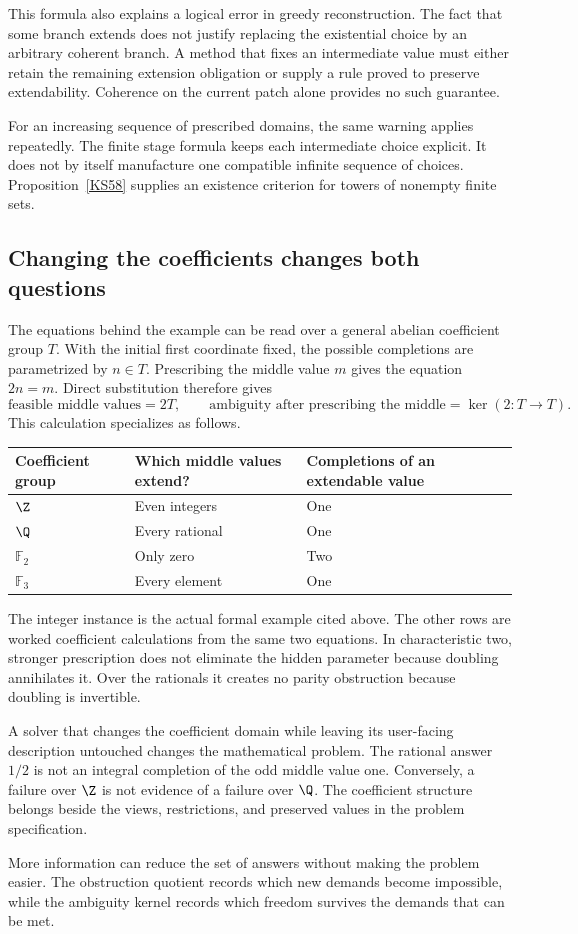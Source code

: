 This formula also explains a logical error in greedy reconstruction. The fact that some branch extends does not justify replacing the existential choice by an arbitrary coherent branch. A method that fixes an intermediate value must either retain the remaining extension obligation or supply a rule proved to preserve extendability. Coherence on the current patch alone provides no such guarantee.

For an increasing sequence of prescribed domains, the same warning applies repeatedly. The finite stage formula keeps each intermediate choice explicit. It does not by itself manufacture one compatible infinite sequence of choices. Proposition~\ref{KS58} supplies an existence criterion for towers of nonempty finite sets.

\subsection{Changing the coefficients changes both questions}
The equations behind the example can be read over a general abelian coefficient group \(T\). With the initial first coordinate fixed, the possible completions are parametrized by \(n\in T\). Prescribing the middle value \(m\) gives the equation \(2n=m\). Direct substitution therefore gives
\[
 \text{feasible middle values}=2T,\qquad
 \text{ambiguity after prescribing the middle}=\ker(2:T\to T).
\]
This calculation specializes as follows.
\begin{center}
\begin{tabular}{@{}lll@{}}
\toprule
Coefficient group & Which middle values extend? & Completions of an extendable value\\
\midrule
\(\Z\) & Even integers & One\\
\(\Q\) & Every rational & One\\
\(\mathbb F_2\) & Only zero & Two\\
\(\mathbb F_3\) & Every element & One\\
\bottomrule
\end{tabular}
\end{center}
The integer instance is the actual formal example cited above. The other rows are worked coefficient calculations from the same two equations. In characteristic two, stronger prescription does not eliminate the hidden parameter because doubling annihilates it. Over the rationals it creates no parity obstruction because doubling is invertible.

A solver that changes the coefficient domain while leaving its user-facing description untouched changes the mathematical problem. The rational answer \(1/2\) is not an integral completion of the odd middle value one. Conversely, a failure over \(\Z\) is not evidence of a failure over \(\Q\). The coefficient structure belongs beside the views, restrictions, and preserved values in the problem specification.

\begin{insight}
More information can reduce the set of answers without making the problem easier. The obstruction quotient records which new demands become impossible, while the ambiguity kernel records which freedom survives the demands that can be met.
\end{insight}
